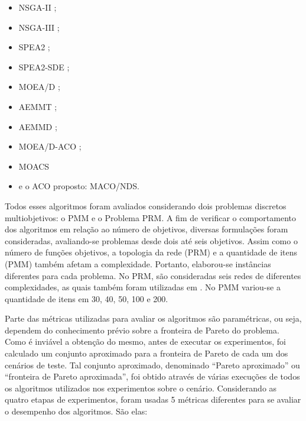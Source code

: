 \acresetall
\begin{itemize}
	\item \ac{NSGA-II} \cite{Deb2002};
	\item \ac{NSGA-III} \cite{Deb2014};
	\item \ac{SPEA2} \cite{Zitzler2002};
	\item \ac{SPEA2-SDE} \cite{Spea2SDE};
	\item \ac{MOEA/D} \cite{Zhang2007};
	\item \ac{AEMMT} \cite{Brasil2013};
	\item \ac{AEMMD} \cite{Lafeta2016};
	\item \ac{MOEA/D-ACO} \cite{Ke2013};
	\item \ac{MOACS} \cite{Riveros2016}
	\item e o ACO proposto: \ac{MACO/NDS}.
\end{itemize}

Todos esses algoritmos foram avaliados considerando dois problemas discretos multiobjetivos: o \ac{PMM} e o Problema \ac{PRM}. A fim  de verificar o comportamento dos algoritmos em relação ao número de objetivos, diversas formulações foram consideradas, avaliando-se problemas desde dois até seis objetivos. Assim como o número de funções objetivos, a topologia da rede (PRM) e a quantidade de itens (PMM) também afetam a complexidade. Portanto, elaborou-se instâncias diferentes para cada problema. No PRM, são consideradas seis redes de diferentes complexidades, as quais também foram utilizadas em \cite{LafetaThesis}. No PMM variou-se a quantidade de itens em 30, 40, 50, 100 e 200.

Parte das métricas utilizadas para avaliar os algoritmos são paramétricas, ou seja, dependem do conhecimento prévio sobre a fronteira de Pareto do problema. Como é inviável a obtenção do mesmo, antes de executar os experimentos, foi calculado um conjunto aproximado para a fronteira de Pareto de cada um dos cenários de teste. Tal conjunto aproximado, denominado ``Pareto aproximado'' ou ``fronteira de Pareto aproximada'', foi obtido através de várias execuções de todos os algoritmos utilizados nos experimentos sobre o cenário. Considerando as quatro etapas de experimentos, foram usadas 5 métricas diferentes para se avaliar o desempenho dos algoritmos. São elas:

